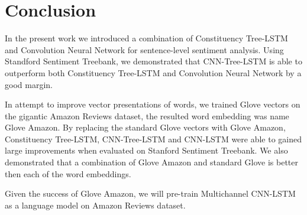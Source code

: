 \section{Conclusion}
In the present work we introduced a combination of Constituency Tree-LSTM and Convolution Neural Network for sentence-level sentiment analysis. 
Using Standford Sentiment Treebank, we demonstrated that CNN-Tree-LSTM is able to outperform both Constituency Tree-LSTM and Convolution Neural Network by a good margin.

In attempt to improve vector presentations of words, we trained Glove vectors on the gigantic Amazon Reviews dataset, the resulted word embedding was name Glove Amazon.
By replacing the standard Glove vectors with Glove Amazon, Constituency Tree-LSTM, CNN-Tree-LSTM and CNN-LSTM were able to gained large improvements when evaluated on Stanford Sentiment Treebank.
We also demonstrated that a combination of Glove Amazon and standard Glove is better then each of the word embeddings.

Given the success of Glove Amazon, we will pre-train Multichannel CNN-LSTM as a language model on Amazon Reviews dataset.

